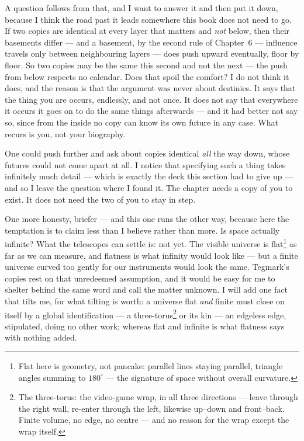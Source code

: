 \documentclass[fontsize=11pt,paper=a4,pagesize=auto,parskip=half-]{scrbook}
\begin{document}
A question follows from that, and I want to answer it and then put it down, because I think the road past it leads somewhere this book does not need to go. If two copies are identical at every layer that matters and \emph{not} below, then their basements differ --- and a basement, by the second rule of Chapter~6 --- influence travels only between neighbouring layers --- does push upward eventually, floor by floor. So two copies may be the same this second and not the next --- the push from below respects no calendar. Does that spoil the comfort? I do not think it does, and the reason is that the argument was never about destinies. It says that the thing you are occurs, endlessly, and not once. It does not say that everywhere it occurs it goes on to do the same things afterwards --- and it had better not say so, since from the inside no copy can know its own future in any case. What recurs is you, not your biography.

One could push further and ask about copies identical \emph{all} the way down, whose futures could not come apart at all. I notice that specifying such a thing takes infinitely much detail --- which is exactly the deck this section had to give up --- and so I leave the question where I found it. The chapter needs a copy of you to exist. It does not need the two of you to stay in step.

One more honesty, briefer --- and this one runs the other way, because here the temptation is to claim less than I believe rather than more. Is space actually infinite? What the telescopes can settle is: not yet. The visible universe is flat\footnote{Flat here is geometry, not pancake: parallel lines staying parallel, triangle angles summing to $180^{\circ}$ --- the signature of space without overall curvature.} as far as we can measure, and flatness is what infinity would look like --- but a finite universe curved too gently for our instruments would look the same. Tegmark's copies rest on that unredeemed assumption, and it would be easy for me to shelter behind the same word and call the matter unknown. I will add one fact that tilts me, for what tilting is worth: a universe flat \emph{and} finite must close on itself by a global identification --- a three-torus\footnote{The three-torus: the video-game wrap, in all three directions --- leave through the right wall, re-enter through the left, likewise up--down and front--back. Finite volume, no edge, no centre --- and no reason for the wrap except the wrap itself.} or its kin --- an edgeless edge, stipulated, doing no other work; whereas flat and infinite is what flatness says with nothing added.
\end{document}
